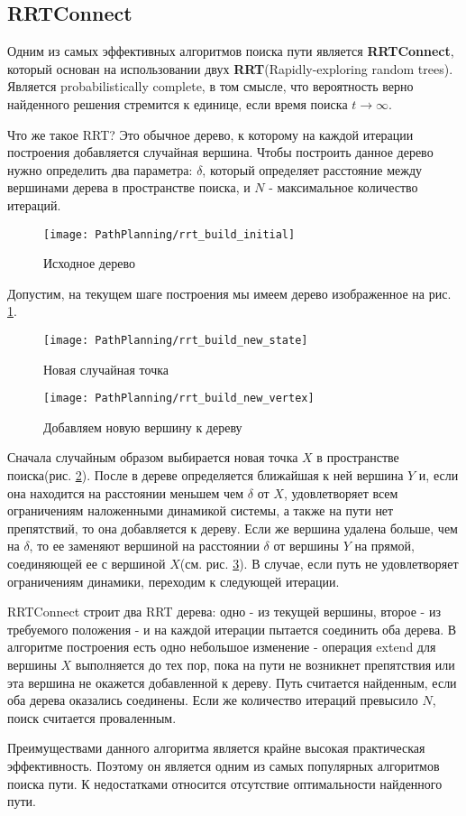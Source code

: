 \subsection{RRTConnect} \label{subsect1_2_3}
Одним из самых эффективных алгоритмов поиска пути является \textbf{RRTConnect}, который основан на использовании двух \textbf{RRT}(Rapidly-exploring random trees)\cite{RRTWiki}. Является probabilistically complete, в том смысле, что вероятность верно найденного решения стремится к единице, если время поиска $t \rightarrow \infty$.

Что же такое RRT? Это обычное дерево, к которому на каждой итерации построения добавляется случайная вершина. Чтобы построить данное дерево нужно определить два параметра: $\delta$, который определяет расстояние между вершинами дерева в пространстве поиска, и $N$ - максимальное количество итераций.
\begin{figure}[ht]
	\centering
	\texttt{[image: PathPlanning/rrt\_build\_initial]}
	\caption{Исходное дерево}
	\label{fig:rrt_build_initial}
\end{figure}
Допустим, на текущем шаге построения мы имеем дерево изображенное на рис. \ref{fig:rrt_build_initial}. 

\begin{figure}[ht]
	\centering
	\texttt{[image: PathPlanning/rrt\_build\_new\_state]}
	\caption{Новая случайная точка}
	\label{fig:rrt_build_new_state}
\end{figure}

\begin{figure}[ht]
	\centering
	\texttt{[image: PathPlanning/rrt\_build\_new\_vertex]}
	\caption{Добавляем новую вершину к дереву}
	\label{fig:rrt_new_vertex}
\end{figure}

Сначала случайным образом выбирается новая точка $X$ в пространстве поиска(рис. \ref{fig:rrt_build_new_state}). После в дереве определяется ближайшая к ней вершина $Y$ и, если она находится на расстоянии меньшем чем $\delta$ от $X$, удовлетворяет всем ограничениям наложенными динамикой системы, а также на пути нет препятствий, то она добавляется к дереву. Если же вершина удалена больше, чем на $\delta$, то ее заменяют вершиной на расстоянии $\delta$ от вершины $Y$ на прямой, соединяющей ее с вершиной $X$(см. рис. \ref{fig:rrt_new_vertex}). В случае, если путь не удовлетворяет ограничениям динамики, переходим к следующей итерации. 

RRTConnect строит два RRT дерева: одно - из текущей вершины, второе - из требуемого положения - и на каждой итерации пытается соединить оба дерева. В алгоритме построения есть одно небольшое изменение - операция extend для вершины $X$ выполняется до тех пор, пока на пути не возникнет препятствия или эта вершина не окажется добавленной к дереву. Путь считается найденным, если оба дерева оказались соединены. Если же количество итераций превысило $N$, поиск считается проваленным.\cite{RRTConnect}

Преимуществами данного алгоритма является крайне высокая практическая эффективность.\cite{RRTConnect} Поэтому он является одним из самых популярных алгоритмов поиска пути. К недостатками относится отсутствие оптимальности найденного пути.